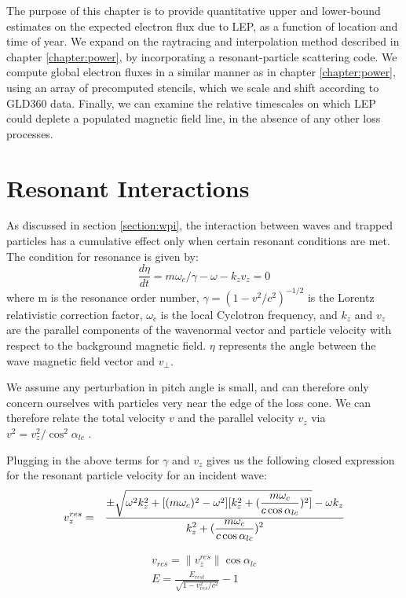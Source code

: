 The purpose of this chapter is to provide quantitative upper and lower-bound estimates on the expected electron flux due to LEP, as a function of location and time of year. We expand on the raytracing and interpolation method described in chapter \ref{chapter:power}, by incorporating a resonant-particle scattering code. We compute global electron fluxes in a similar manner as in chapter \ref{chapter:power}, using an array of precomputed stencils, which we scale and shift according to GLD360 data. Finally, we can examine the relative timescales on which LEP could deplete a populated magnetic field line, in the absence of any other loss processes.

\section{Resonant Interactions}
As discussed in section \ref{section:wpi}, the interaction between waves and trapped particles has a cumulative effect only when certain resonant conditions are met. The condition for resonance is given by:
\begin{equation}
\frac{d\eta}{dt} = m \omega_c/\gamma - \omega - k_z v_z = 0
\label{eqn:resonance_cond}
\end{equation} 
where m is the resonance order number, $\gamma = (1 - v^2/c^2)^{-1/2}$ is the Lorentz relativistic correction factor, $\omega_c$ is the local Cyclotron frequency, and $k_z$ and $v_z$ are the parallel components of the wavenormal vector and particle velocity with respect to the background magnetic field. $\eta$ represents the angle between the wave magnetic field vector and $v_\perp$.

We assume any perturbation in pitch angle is small, and can therefore only concern ourselves with particles very near the edge of the loss cone. We can therefore relate the total velocity $v$ and the parallel velocity $v_z$ via $v^2 = v_z^2/\cos^2\alpha_{lc}$ \citep{Lauben2001, Bortnik2006}.

Plugging in the above terms for $\gamma$ and $v_z$ gives us the following closed expression for the resonant particle velocity for an incident wave:
\begin{eqnarray}
v_z^{res} & = & \frac{\displaystyle \pm \sqrt{\omega^2 k_z^2 + [(m \omega_c)^2 - \omega^2] [k_z^2 + (\frac{m \omega_c}{c \cos \alpha_{lc}})^2]} - \omega k_z}{\displaystyle k_z^2 + (\frac{m \omega_c}{c \cos \alpha_{lc}})^2}
\label{eqn:vzres}
\end{eqnarray}

\begin{eqnarray}
v_{res} = \|v_z^{res}\|\cos\alpha_{lc} \\
E = \frac{E_{rest}}{\sqrt{1 - v_{res}^2/c^2}} - 1
\end{eqnarray}

